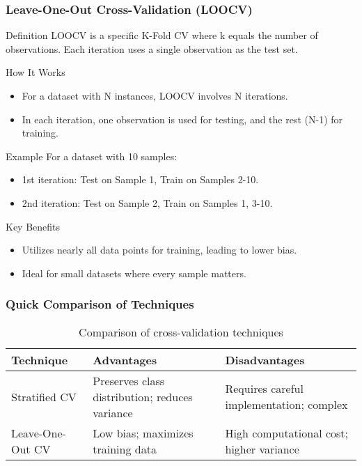 \documentclass[aspectratio=169]{beamer}
\begin{document}
\begin{frame}[fragile]
    \frametitle{Leave-One-Out Cross-Validation (LOOCV)}
    \begin{block}{Definition}
        LOOCV is a specific K-Fold CV where k equals the number of observations. Each iteration uses a single observation as the test set.
    \end{block}

    \begin{block}{How It Works}
        \begin{itemize}
            \item For a dataset with N instances, LOOCV involves N iterations.
            \item In each iteration, one observation is used for testing, and the rest (N-1) for training.
        \end{itemize}
    \end{block}

    \begin{block}{Example}
        For a dataset with 10 samples:
        \begin{itemize}
            \item 1st iteration: Test on Sample 1, Train on Samples 2-10.
            \item 2nd iteration: Test on Sample 2, Train on Samples 1, 3-10.
        \end{itemize}
    \end{block}

    \begin{block}{Key Benefits}
        \begin{itemize}
            \item Utilizes nearly all data points for training, leading to lower bias.
            \item Ideal for small datasets where every sample matters.
        \end{itemize}
    \end{block}
\end{frame}

\begin{frame}[fragile]
    \frametitle{Quick Comparison of Techniques}
    \begin{table}[ht]
        \centering
        \begin{tabular}{@{}lll@{}}
            \toprule
            Technique                     & Advantages                                & Disadvantages                    \\ \midrule
            Stratified CV                 & Preserves class distribution; reduces variance & Requires careful implementation; complex  \\
            Leave-One-Out CV             & Low bias; maximizes training data         & High computational cost; higher variance \\ \bottomrule
        \end{tabular}
        \caption{Comparison of cross-validation techniques}
    \end{table}
\end{frame}
\end{document}
